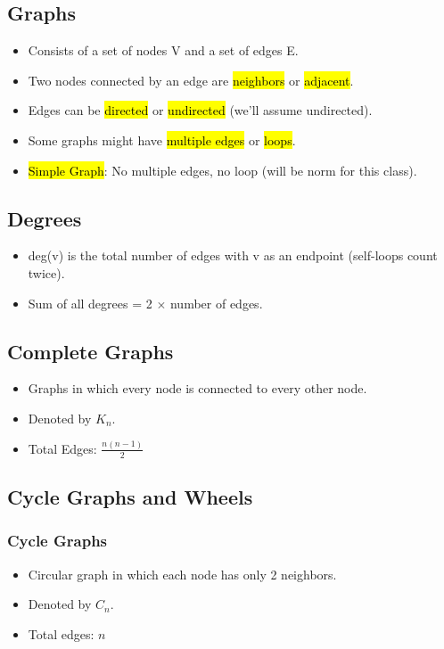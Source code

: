 \subsection{Graphs}
\begin{itemize}
    \item Consists of a set of nodes V and a set of edges E.
    \item Two nodes connected by an edge are \hl{neighbors} or \hl{adjacent}.
    \item Edges can be \hl{directed} or \hl{undirected} (we'll assume undirected).
    \item Some graphs might have \hl{multiple edges} or \hl{loops}.
    \item \hl{Simple Graph}: No multiple edges, no loop (will be norm for this class).
\end{itemize}

\subsection{Degrees}
\begin{itemize}
    \item deg(v) is the total number of edges with v as an endpoint (self-loops count twice).
    \item Sum of all degrees = 2 $\times$ number of edges.
\end{itemize}

\subsection{Complete Graphs}
\begin{itemize}
    \item Graphs in which every node is connected to every other node.
    \item Denoted by $K_n$.
    \item Total Edges: $\frac{n(n-1)}{2}$
\end{itemize}

\subsection{Cycle Graphs and Wheels}
\subsubsection{Cycle Graphs}
\begin{itemize}
    \item Circular graph in which each node has only 2 neighbors.
    \item Denoted by $C_n$.
    \item Total edges: $n$
\end{itemize}
